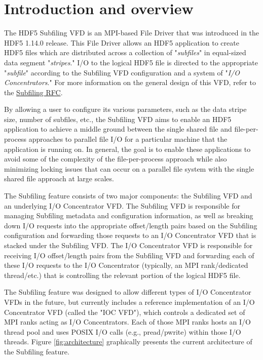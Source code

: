 \documentclass[../main.tex]{subfiles}
\begin{document}
\newpage

\section{Introduction and overview}
\label{intro}

The HDF5 Subfiling \Gls{VFD} is an MPI-based File Driver that was introduced in the HDF5 1.14.0 release.
This File Driver allows an HDF5 application to create HDF5 files which are distributed across a collection
of "\textit{subfiles}" in equal-sized data segment "\textit{stripes}." I/O to the logical HDF5 file is directed to the
appropriate "\textit{subfile}" according to the Subfiling VFD configuration and a system of "\textit{I/O Concentrators}."
For more information on the general design of this VFD, refer to the \href{https://github.com/HDFGroup/hdf5doc/blob/master/RFCs/HDF5_Library/VFD_Subfiling/RFC_VFD_subfiling_200424.docx}{Subfiling RFC}.

By allowing a user to configure its various parameters, such as the data stripe size, number of subfiles,
etc., the Subfiling VFD aims to enable an HDF5 application to achieve a middle ground between the single
shared file and file-per-process approaches to parallel file I/O for a particular machine that the application
is running on. In general, the goal is to enable these applications to avoid some of the complexity of the
file-per-process approach while also minimizing locking issues that can occur on a parallel file system
with the single shared file approach at large scales.

The Subfiling feature consists of two major components: the Subfiling VFD and an underlying I/O
Concentrator VFD. The Subfiling VFD is responsible for managing Subfiling metadata and configuration
information, as well as breaking down I/O requests into the appropriate offset/length pairs based on
the Subfiling configuration and forwarding those requests to an I/O Concentrator VFD that is stacked
under the Subfiling VFD. The I/O Concentrator VFD is responsible for receiving I/O offset/length
pairs from the Subfiling VFD and forwarding each of these I/O requests to the I/O Concentrator
(typically, an MPI rank/dedicated thread/etc.) that is controlling the relevant portion of the logical
HDF5 file.

The Subfiling feature was designed to allow different types of I/O Concentrator VFDs in the future,
but currently includes a reference implementation of an I/O Concentrator VFD (called the
"IOC VFD"), which controls a dedicated set of MPI ranks acting as I/O Concentrators. Each of those MPI
ranks hosts an I/O thread pool and uses POSIX I/O calls (e.g., pread/pwrite) within those I/O threads.
Figure \ref{fig:architecture} graphically presents the current architecture of the Subfiling feature.
\end{document}
